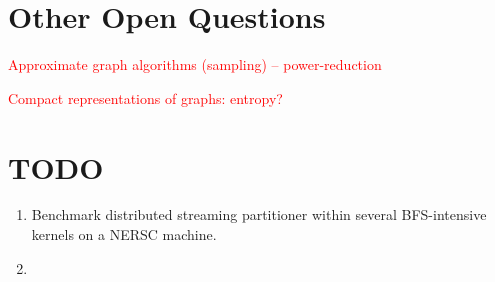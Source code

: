 \documentclass[11pt]{article}
\newcommand\warning[1]{\textcolor{red}{#1}}
\begin{document}

\newpage \section{Other Open Questions}

\warning{Approximate graph algorithms (sampling) -- power-reduction}

\warning{Compact representations of graphs: entropy?}


\newpage \section{TODO}
\begin{enumerate}
\item Benchmark distributed streaming partitioner within several BFS-intensive kernels on a NERSC machine.
\item
\end{enumerate}




\end{document}
